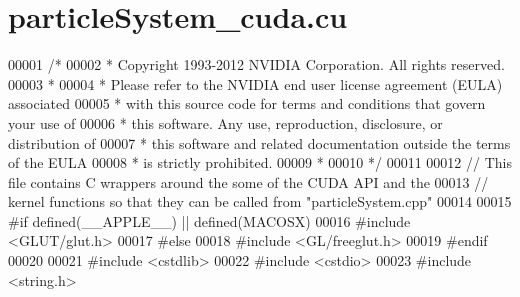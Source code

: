 \hypertarget{particle_system__cuda_8cu_source}{\section{particle\-System\-\_\-cuda.\-cu}
}

\begin{DoxyCode}
00001 \textcolor{comment}{/*}
00002 \textcolor{comment}{ * Copyright 1993-2012 NVIDIA Corporation.  All rights reserved.}
00003 \textcolor{comment}{ *}
00004 \textcolor{comment}{ * Please refer to the NVIDIA end user license agreement (EULA) associated}
00005 \textcolor{comment}{ * with this source code for terms and conditions that govern your use of}
00006 \textcolor{comment}{ * this software. Any use, reproduction, disclosure, or distribution of}
00007 \textcolor{comment}{ * this software and related documentation outside the terms of the EULA}
00008 \textcolor{comment}{ * is strictly prohibited.}
00009 \textcolor{comment}{ *}
00010 \textcolor{comment}{ */}
00011 
00012 \textcolor{comment}{// This file contains C wrappers around the some of the CUDA API and the}
00013 \textcolor{comment}{// kernel functions so that they can be called from "particleSystem.cpp"}
00014 
00015 \textcolor{preprocessor}{#}\textcolor{preprocessor}{if} \textcolor{preprocessor}{defined}\textcolor{preprocessor}{(}\textcolor{preprocessor}{\_\_APPLE\_\_}\textcolor{preprocessor}{)} \textcolor{preprocessor}{||} \textcolor{preprocessor}{defined}\textcolor{preprocessor}{(}\textcolor{preprocessor}{MACOSX}\textcolor{preprocessor}{)}
00016 \textcolor{preprocessor}{#}\textcolor{preprocessor}{include} \textcolor{preprocessor}{<}\textcolor{preprocessor}{GLUT}\textcolor{preprocessor}{/}\textcolor{preprocessor}{glut}\textcolor{preprocessor}{.}\textcolor{preprocessor}{h}\textcolor{preprocessor}{>}
00017 \textcolor{preprocessor}{#}\textcolor{preprocessor}{else}
00018 \textcolor{preprocessor}{#}\textcolor{preprocessor}{include} \textcolor{preprocessor}{<}\textcolor{preprocessor}{GL}\textcolor{preprocessor}{/}\textcolor{preprocessor}{freeglut}\textcolor{preprocessor}{.}\textcolor{preprocessor}{h}\textcolor{preprocessor}{>}
00019 \textcolor{preprocessor}{#}\textcolor{preprocessor}{endif}
00020 
00021 \textcolor{preprocessor}{#}\textcolor{preprocessor}{include} \textcolor{preprocessor}{<}\textcolor{preprocessor}{cstdlib}\textcolor{preprocessor}{>}
00022 \textcolor{preprocessor}{#}\textcolor{preprocessor}{include} \textcolor{preprocessor}{<}\textcolor{preprocessor}{cstdio}\textcolor{preprocessor}{>}
00023 \textcolor{preprocessor}{#}\textcolor{preprocessor}{include} \textcolor{preprocessor}{<}\textcolor{preprocessor}{string}\textcolor{preprocessor}{.}\textcolor{preprocessor}{h}\textcolor{preprocessor}{>}

\end{DoxyCode}
